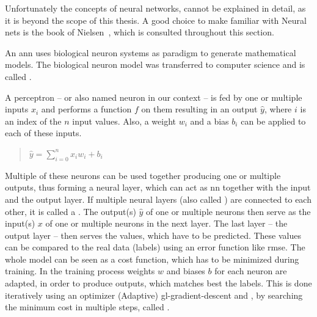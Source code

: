 Unfortunately the concepts of neural networks, cannot be explained in detail, as it is beyond the scope of this thesis.
A good choice to make familiar with Neural nets is the book  of Nielsen~\cite{nielsen2015neural}, which is consulted throughout this section.

An \gls{ann} uses biological neuron systems as paradigm to generate mathematical models.
The biological neuron model was transferred to computer science and is called .

A perceptron -- or also named neuron in our context -- is fed by one or multiple inputs $x_i$ and performs a function $f$ on them resulting in an output $\hat{y}$, where $i$ is an index of the $n$ input values.
Also, a weight $w_i$ and a bias $b_i$ can be applied to each of these inputs.

\begin{quote}
    \begin{math}
        \hat{y} = \sum_{i=0}^{n} x_i w_i+b_i
    \end{math}\newline
\end{quote}

Multiple of these neurons can be used together producing one or multiple outputs, thus forming a neural layer, which can act as \gls{nn} together with the input and the output layer.
If multiple neural layers (also called ) are connected to each other, it is called a .
The output(s) $\hat{y}$ of one or multiple neurons then serve as the input(s) $x$ of one or multiple neurons in the next layer.
The last layer -- the output layer -- then serves the values, which have to be predicted.
These values can be compared to the real data (labels) using an error function like \gls{rmse}.
The whole model can be seen as a cost function, which has to be minimized during training.
In the training process weights $w$ and biases $b$ for each neuron are adapted, in order to produce outputs, which matches best the labels.
This is done iteratively using an optimizer (Adaptive) \gls{gl-gradient-descent} and , by searching the minimum cost in multiple steps, called .

%
%

